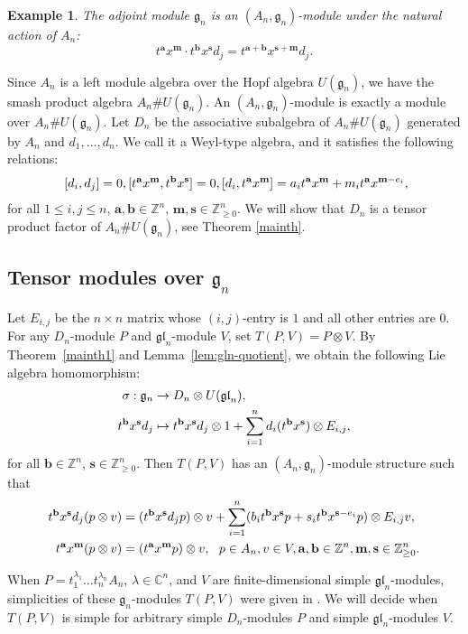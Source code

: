 \documentclass[12pt,a4paper]{amsart}
\def\mg{g}%
\def\gl{gl}%
\newtheorem{example}[theorem]{Example}%
\numberwithin{equation}{section}
\newcommand{\C}{\mathbb C}
\newcommand{\Z}{\mathbb{Z}}
\def\mg{\mathfrak{g}}
\def\gl{\mathfrak{gl}}
\def\ba{\mathbf{a}}
\def\bs{\mathbf{s}}
\def\bm{\mathbf{m}}
\def\bb{\mathbf{b}}
\begin{document}
\begin{example}The adjoint module $\mg_n$ is an $(A_n,\mg_n)$-module
under the natural action of $A_n$:
$$t^{\ba}x^{\bm} \cdot t^{\bb}x^{\bs}d_j=t^{\ba+\bb}x^{\bs+\bm}d_j.$$
\end{example}

Since  $A_n$ is a left  module algebra over the Hopf algebra $U(\mg_n)$, we have the smash product algebra $A_n\# U(\mg_n)$. An $(A_n,\mg_n)$-module
is exactly a module over  $A_n\# U(\mg_n)$. Let $D_n$ be the associative subalgebra of $A_n\#U(\mg_n)$ generated by $A_n$ and $d_1,\dots,d_n$. We call it a Weyl-type algebra, and it satisfies the following relations:
$$\aligned \
[d_i,d_j]=0, [t^{\ba}x^{\bm},t^{\bb}x^{\bs}]=0, [d_i,t^{\ba}x^{\bm}]=a_it^{\ba}x^{\bm}+m_it^{\ba}x^{\bm-e_i},
\endaligned $$
for all $1\leq i,j\leq n$, $\ba,\bb\in \Z^n$, $\bm,\bs\in \Z^n_{\geq0}$. We will show that $D_n$ is a tensor product factor
of $A_n\# U(\mg_n)$, see Theorem \ref{mainth}.

\subsection{Tensor  modules over $\mg_n$}

Let $E_{i,j}$ be the $n\times n$ matrix whose $(i,j)$-entry is $1$ and all other entries are $0$. For any $D_n$-module $P$ and  $\gl_n$-module $V$, set $T(P, V)=P\otimes V$. By
Theorem~\ref{mainth1} and Lemma~\ref{lem:gln-quotient}, we obtain the
following Lie algebra homomorphism:
$$\aligned \
\sigma: \mg_n &\rightarrow D_n\otimes U(\gl_n),\\
t^{\bb}x^{\bs}d_j &\mapsto t^{\bb}x^{\bs}d_j\otimes 1 + \sum^n_{i=1}d_i(t^{\bb}x^{\bs})\otimes E_{i,j},
\endaligned$$
for all $\bb\in \Z^n$, $\bs\in \Z^n_{\geq0}$.
Then \(T(P,V)\) has an \((A_n,\mg_n)\)-module
structure such that
$$\aligned
t^{\bb}x^{\bs}d_j(p\otimes v)&=(t^{\bb}x^{\bs}d_j p)\otimes v
+\sum_{i=1}^n(b_it^{\bb}x^{\bs}p+s_it^{\bb}x^{\bs-e_i}p)\otimes E_{i,j}v,\\
t^{\ba}x^{\bm}(p\otimes v)&=(t^{\ba}x^{\bm}p)\otimes v, \ \ p\in A_n, v\in V, \ba,\bb\in \Z^n, \bm,\bs\in \Z^n_{\geq0}.
\endaligned$$

When  $P=t_1^{\lambda_1}\dots t_n^{\lambda_n} A_n$, $\lambda\in \C^n$, and $V$ are finite-dimensional simple $\gl_n$-modules, simplicities of these $\mg_n$-modules $T(P, V)$  were given  in \cite{Z}. We will decide
when \(T(P,V)\) is simple for arbitrary simple \(D_n\)-modules \(P\)
and simple \(\gl_n\)-modules \(V\).
\end{document}
